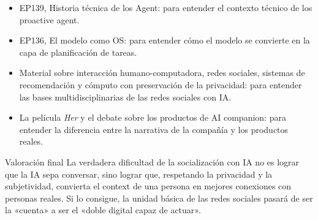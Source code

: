 \documentclass[a4paper]{article}
\begin{document}
\begin{itemize}
\item EP139, Historia técnica de los Agent: para entender el contexto técnico de los proactive agent.
\item EP136, El modelo como OS: para entender cómo el modelo se convierte en la capa de planificación de tareas.
\item Material sobre interacción humano-computadora, redes sociales, sistemas de recomendación y cómputo con preservación de la privacidad: para entender las bases multidisciplinarias de las redes sociales con IA.
\item La película \textit{Her} y el debate sobre los productos de AI companion: para entender la diferencia entre la narrativa de la compañía y los productos reales.
\end{itemize}

\begin{importantbox}{Valoración final}
La verdadera dificultad de la socialización con IA no es lograr que la IA sepa conversar, sino lograr que, respetando la privacidad y la subjetividad, convierta el context de una persona en mejores conexiones con personas reales. Si lo consigue, la unidad básica de las redes sociales pasará de ser la «cuenta» a ser el «doble digital capaz de actuar».\end{importantbox}
\end{document}
